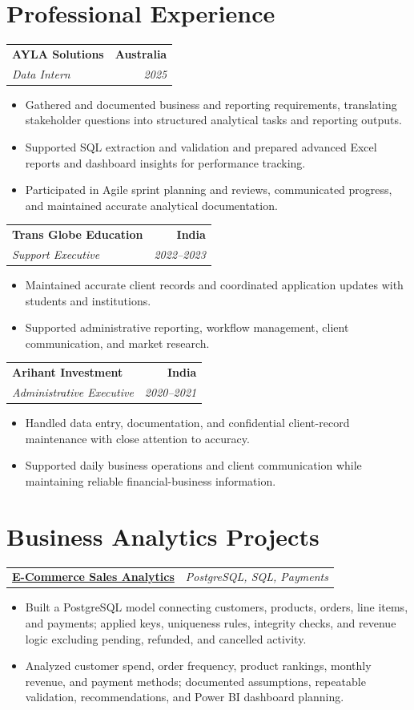 \documentclass[letterpaper,10pt]{article}
\makeatletter
\newcommand{\role}[4]{%
  \begin{tabularx}{\textwidth}{@{}Xr@{}}
    \textbf{#1} & \textbf{#2} \\
    \textit{#3} & \textit{#4}
  \end{tabularx}\vspace{-1pt}
}
\newcommand{\project}[2]{%
  \begin{tabularx}{\textwidth}{@{}Xr@{}}
    \textbf{#1} & \textit{#2}
  \end{tabularx}\vspace{-1pt}
}
\makeatother
\begin{document}
\section{Professional Experience}
\role{AYLA Solutions}{Australia}{Data Intern}{2025}
\begin{itemize}
  \item Gathered and documented business and reporting requirements, translating stakeholder questions into structured analytical tasks and reporting outputs.
  \item Supported SQL extraction and validation and prepared advanced Excel reports and dashboard insights for performance tracking.
  \item Participated in Agile sprint planning and reviews, communicated progress, and maintained accurate analytical documentation.
\end{itemize}
\vspace{1pt}

\role{Trans Globe Education}{India}{Support Executive}{2022--2023}
\begin{itemize}
  \item Maintained accurate client records and coordinated application updates with students and institutions.
  \item Supported administrative reporting, workflow management, client communication, and market research.
\end{itemize}
\vspace{1pt}

\role{Arihant Investment}{India}{Administrative Executive}{2020--2021}
\begin{itemize}
  \item Handled data entry, documentation, and confidential client-record maintenance with close attention to accuracy.
  \item Supported daily business operations and client communication while maintaining reliable financial-business information.
\end{itemize}

\section{Business Analytics Projects}
\project{\href{https://github.com/jainalimehta/Ecommerce-Sales-Analytics}{E-Commerce Sales Analytics}}{PostgreSQL, SQL, Payments}
\begin{itemize}
  \item Built a PostgreSQL model connecting customers, products, orders, line items, and payments; applied keys, uniqueness rules, integrity checks, and revenue logic excluding pending, refunded, and cancelled activity.
  \item Analyzed customer spend, order frequency, product rankings, monthly revenue, and payment methods; documented assumptions, repeatable validation, recommendations, and Power BI dashboard planning.
\end{itemize}
\vspace{1pt}
\end{document}
